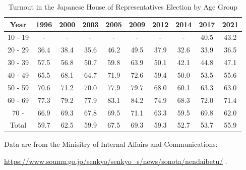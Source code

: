 \begin{table}
  \begin{threeparttable}
    \begin{tabular}{c|ccccccccc}
    \toprule
    Year & 1996 & 2000 & 2003 & 2005 & 2009 & 2012 & 2014 & 2017 & 2021 \\
    \midrule
    10 - 19 & - & - & - & - & - & - & - & 40.5 & 43.2 \\
    20 - 29 & 36.4 & 38.4 & 35.6 & 46.2 & 49.5 & 37.9 & 32.6 & 33.9 & 36.5 \\
    30 - 39 & 57.5 & 56.8 & 50.7 & 59.8 & 63.9 & 50.1 & 42.1 & 44.8 & 47.1 \\
    40 - 49 & 65.5 & 68.1 & 64.7 & 71.9 & 72.6 & 59.4 & 50.0 & 53.5 & 55.6 \\
    50 - 59 & 70.6 & 71.2 & 70.0 & 77.9 & 79.7 & 68.0 & 60.1 & 63.3 & 63.0 \\
    60 - 69 & 77.3 & 79.2 & 77.9 & 83.1 & 84.2 & 74.9 & 68.3 & 72.0 & 71.4 \\
    70 - & 66.9 & 69.3 & 67.8 & 69.5 & 71.1 & 63.3 & 59.5 & 69.8 & 62.0 \\
    \midrule
    Total & 59.7 & 62.5 & 59.9 & 67.5 & 69.3 & 59.3 & 52.7 & 53.7 & 55.9 \\
    \bottomrule
    \end{tabular}
    \begin{tablenotes}[flushleft]
      \scriptsize{
        \item Data are from the Minisitry of Internal Affairs and Communications: 
        \item \url{https://www.soumu.go.jp/senkyo/senkyo_s/news/sonota/nendaibetu/} \citep{miac2023}.
      }
    \end{tablenotes}
  \end{threeparttable}
  \caption{Turnout in the Japanese House of Representatives Election by Age Group}
  \label{table:turnout}
\end{table}